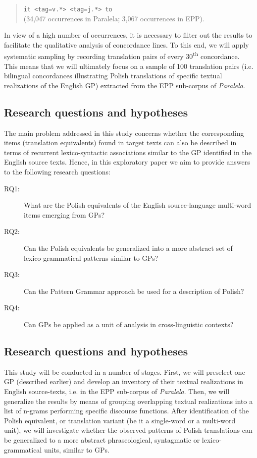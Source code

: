 \documentclass[output=paper]{langscibook}
\begin{document}
\begin{quote}
\texttt{it <tag=v.*> <tag=j.*> to}\\
(34,047 occurrences in Paralela; 3,067 occurrences in EPP).
\end{quote}

In view of a high number of occurrences, it is necessary to filter out the results to facilitate the qualitative analysis of concordance lines. To this end, we will apply systematic sampling by recording translation pairs of every 30\textsuperscript{th} concordance. This means that we will ultimately focus on a sample of 100 translation pairs (i.e. bilingual concordances illustrating Polish translations of specific textual realizations of the English GP) extracted from the EPP sub-corpus of \textit{Paralela}.

\subsection{Research questions and hypotheses}

The main problem addressed in this study concerns whether the corresponding items (translation equivalents) found in target texts can also be described in terms of recurrent lexico-syntactic associations similar to the GP identified in the English source texts. Hence, in this exploratory paper we aim to provide answers to the following research questions:

\begin{description}
\item[RQ1:] What are the Polish equivalents of the English source-language multi-word items emerging from GPs?
\item[RQ2:] Can the Polish equivalents be generalized into a more abstract set of lexico-grammatical patterns similar to GPs?
\item[RQ3:] Can the Pattern Grammar approach be used for a description of Polish?
\item[RQ4:] Can GPs be applied as a unit of analysis in cross-linguistic contexts?
\end{description}

\subsection{Research questions and hypotheses}

This study will be conducted in a number of stages. First, we will preselect one GP (described earlier) and develop an inventory of their textual realizations in English source-texts, i.e. in the EPP sub-corpus of \textit{Paralela}. Then, we will generalize the results by means of grouping overlapping textual realizations into a list of n-grams performing specific discourse functions. After identification of the Polish equivalent, or translation variant (be it a single-word or a multi-word unit), we will investigate whether the observed patterns of Polish translations can be generalized to a more abstract phraseological, syntagmatic or lexico-grammatical units, similar to GPs.
\end{document}
